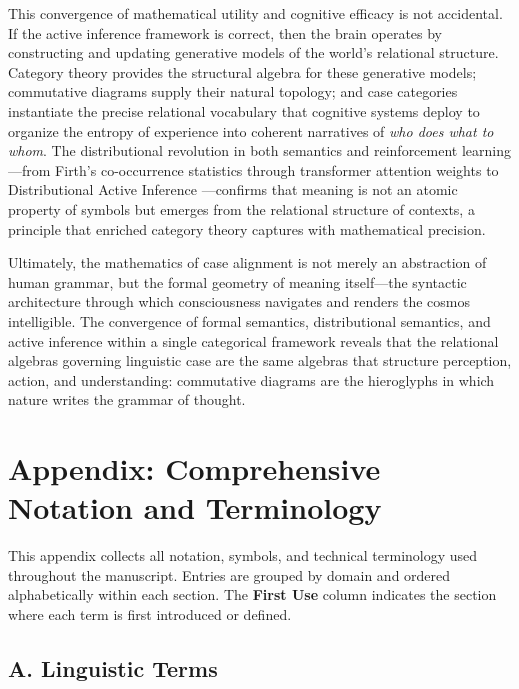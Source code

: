 \documentclass[
]{article}
\numberwithin{equation}{section}
\begin{document}
This convergence of mathematical utility and cognitive efficacy is not
accidental. If the active inference framework is correct, then the brain
operates by constructing and updating generative models of the world's
relational structure. Category theory provides the structural algebra
for these generative models; commutative diagrams supply their natural
topology; and case categories instantiate the precise relational
vocabulary that cognitive systems deploy to organize the entropy of
experience into coherent narratives of \emph{who does what to whom}. The
distributional revolution in both semantics and reinforcement
learning---from Firth's \citeyearpar{firth1957papers} co-occurrence
statistics through transformer attention weights to Distributional
Active Inference \citep{akgul2026distributional}---confirms that meaning
is not an atomic property of symbols but emerges from the relational
structure of contexts, a principle that enriched category theory
captures with mathematical precision.

Ultimately, the mathematics of case alignment is not merely an
abstraction of human grammar, but the formal geometry of meaning
itself---the syntactic architecture through which consciousness
navigates and renders the cosmos intelligible. The convergence of formal
semantics, distributional semantics, and active inference within a
single categorical framework reveals that the relational algebras
governing linguistic case are the same algebras that structure
perception, action, and understanding: commutative diagrams are the
hieroglyphs in which nature writes the grammar of thought.

\newpage

\section{Appendix: Comprehensive Notation and
Terminology}\label{sec:notation}

This appendix collects all notation, symbols, and technical terminology
used throughout the manuscript. Entries are grouped by domain and
ordered alphabetically within each section. The \textbf{First Use}
column indicates the section where each term is first introduced or
defined.

\subsection{A. Linguistic Terms}\label{a.-linguistic-terms}
\end{document}
